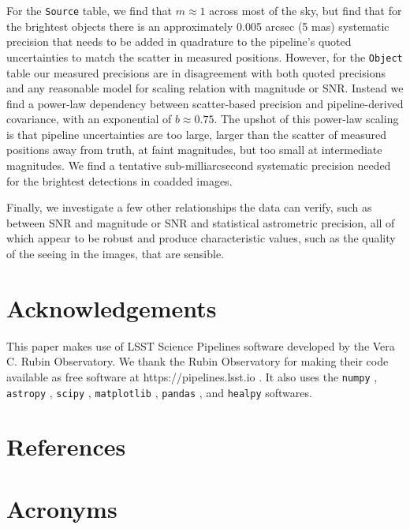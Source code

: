 \documentclass[SE,lsstdraft,authoryear,toc]{lsstdoc}
\begin{document}
For the \texttt{Source} table, we find that $m \approx 1$ across most of the sky, but find that for the brightest objects there is an approximately 0.005 arcsec (5 mas) systematic precision that needs to be added in quadrature to the pipeline's quoted uncertainties to match the scatter in measured positions.
However, for the \texttt{Object} table our measured precisions are in disagreement with both quoted precisions and any reasonable model for scaling relation with magnitude or SNR.
Instead we find a power-law dependency between scatter-based precision and pipeline-derived covariance, with an exponential of $b \approx 0.75$.
The upshot of this power-law scaling is that pipeline uncertainties are too large, larger than the scatter of measured positions away from truth, at faint magnitudes, but too small at intermediate magnitudes.
We find a tentative sub-milliarcsecond systematic precision needed for the brightest detections in coadded images.

Finally, we investigate a few other relationships the data can verify, such as between SNR and magnitude or SNR and statistical astrometric precision, all of which appear to be robust and produce characteristic values, such as the quality of the seeing in the images, that are sensible.

\section{Acknowledgements}
This paper makes use of LSST Science Pipelines software developed by the Vera C. Rubin Observatory. We thank the Rubin Observatory for making their code available as free software at https://pipelines.lsst.io \citep{NDVRO2025,Jenness2022}.
It also uses the \texttt{numpy} \citep{Harris2020}, \texttt{astropy} \citep{2013A&A...558A..33A,2018AJ....156..123A}, \texttt{scipy} \citep{scipy}, \texttt{matplotlib} \citep{matplotlib}, \texttt{pandas} \citep{mckinney-proc-scipy-2010-pandas}, and \texttt{healpy} \citep{Zonca2019,2005ApJ...622..759G} softwares.

\appendix
\section{References} \label{sec:bib}
\renewcommand{\refname}{} %


\section{Acronyms} \label{sec:acronyms}

\end{document}
